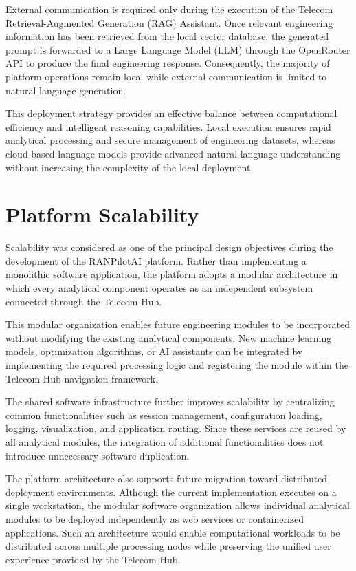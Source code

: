 External communication is required only during the execution of the Telecom Retrieval-Augmented Generation (RAG) Assistant. Once relevant engineering information has been retrieved from the local vector database, the generated prompt is forwarded to a Large Language Model (LLM) through the OpenRouter API to produce the final engineering response. Consequently, the majority of platform operations remain local while external communication is limited to natural language generation.

This deployment strategy provides an effective balance between computational efficiency and intelligent reasoning capabilities. Local execution ensures rapid analytical processing and secure management of engineering datasets, whereas cloud-based language models provide advanced natural language understanding without increasing the complexity of the local deployment.

\section{Platform Scalability}

Scalability was considered as one of the principal design objectives during the development of the RANPilotAI platform. Rather than implementing a monolithic software application, the platform adopts a modular architecture in which every analytical component operates as an independent subsystem connected through the Telecom Hub.

This modular organization enables future engineering modules to be incorporated without modifying the existing analytical components. New machine learning models, optimization algorithms, or AI assistants can be integrated by implementing the required processing logic and registering the module within the Telecom Hub navigation framework.

The shared software infrastructure further improves scalability by centralizing common functionalities such as session management, configuration loading, logging, visualization, and application routing. Since these services are reused by all analytical modules, the integration of additional functionalities does not introduce unnecessary software duplication.

The platform architecture also supports future migration toward distributed deployment environments. Although the current implementation executes on a single workstation, the modular software organization allows individual analytical modules to be deployed independently as web services or containerized applications. Such an architecture would enable computational workloads to be distributed across multiple processing nodes while preserving the unified user experience provided by the Telecom Hub.

